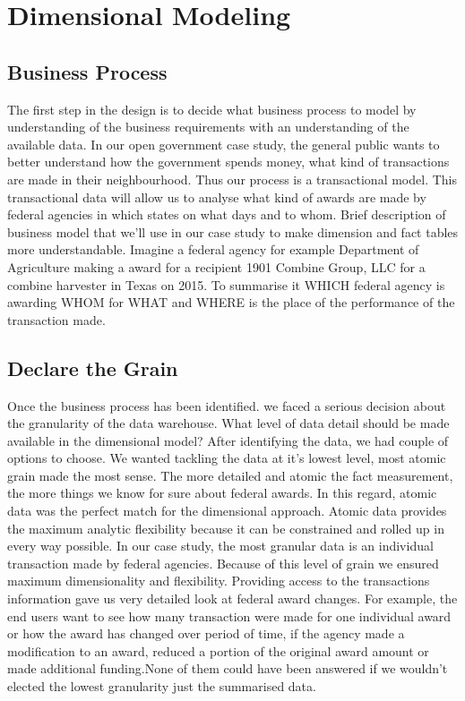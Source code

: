 \documentclass[letterpaper,10pt,oneside]{sphinxmanual}
\begin{document}
\section{Dimensional Modeling}
\label{datawarehouse:dimensional-modeling}

\subsection{Business Process}
\label{datawarehouse:business-process}
The first step in the design is to decide what business process to model by understanding of
the business requirements with an understanding of the available data. In our open government case study,
the general public wants to better understand how the government spends money, what kind of transactions are
made in their neighbourhood. Thus our process is a transactional model. This transactional data will allow us
to analyse what kind of awards are made by federal agencies in which states on what days and to whom.
Brief description of business model that we’ll use in our case study to make dimension and fact tables
more understandable. Imagine a federal agency for example Department of Agriculture making a award for a
recipient 1901 Combine Group, LLC for a combine harvester in Texas on 2015. To summarise it WHICH federal
agency is awarding WHOM for WHAT and WHERE is the place of the performance of the transaction made.


\subsection{Declare the Grain}
\label{datawarehouse:declare-the-grain}
Once the business process has been identified. we faced a serious decision about the granularity of the data warehouse.
What level of data detail should be made available in the dimensional model?
After identifying the data, we had couple of options to choose. We wanted tackling the data at it’s lowest level,
most atomic grain made the most sense. The more detailed and atomic the fact measurement, the more things we know for
sure about federal awards. In this regard, atomic data was the perfect match for the dimensional approach.
Atomic data provides the maximum analytic flexibility because it can be constrained and rolled up in every way possible.
In our case study, the most granular data is an individual transaction made by federal agencies. Because of this level of
grain we ensured maximum dimensionality and flexibility. Providing access to the transactions information gave us very
detailed look at federal award changes. For example, the end users want to see how many transaction were made for one
individual award or how the award has changed over period of time, if the agency made a modification to an award,
reduced a portion of the original award amount or made additional funding.None of them could have been answered if we wouldn't
elected the lowest granularity just the summarised data.
\end{document}
